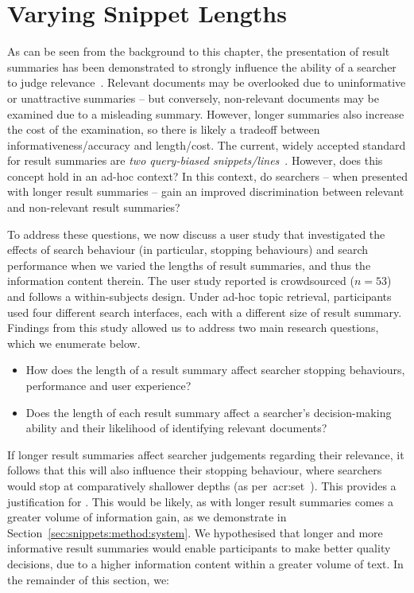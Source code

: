 \section{Varying Snippet Lengths}\label{chap:snippets:user}
As can be seen from the background to this chapter, the presentation of result summaries has been demonstrated to strongly influence the ability of a searcher to judge relevance~\citep{he2012bridging}. Relevant documents may be overlooked due to uninformative or unattractive summaries -- but conversely, non-relevant documents may be examined due to a misleading summary. However, longer summaries also increase the cost of the examination, so there is likely a tradeoff between informativeness/accuracy and length/cost. The current, widely accepted standard for result summaries are \emph{two query-biased snippets/lines}~\citep{hearst2009_search}. However, does this concept hold in an ad-hoc context? In this context, do searchers -- when presented with longer result summaries -- gain an improved discrimination between relevant and non-relevant result summaries?

To address these questions, we now discuss a user study that investigated the effects of search behaviour (in particular, stopping behaviours) and search performance when we varied the lengths of result summaries, and thus the information content therein. The user study reported is crowdsourced ($n=53$) and follows a within-subjects design. Under ad-hoc topic retrieval, participants used four different search interfaces, each with a different size of result summary. Findings from this study allowed us to address two main research questions, which we enumerate below.

\begin{itemize}
    \item{ How does the length of a result summary affect searcher stopping behaviours, performance and user experience?}
    \item{ Does the length of each result summary affect a searcher's decision-making ability and their likelihood of identifying relevant documents?}
\end{itemize}

If longer result summaries affect searcher judgements regarding their relevance, it follows that this will also influence their stopping behaviour, where searchers would stop at comparatively shallower depths (as per~\gls{acr:set}~\citep{azzopardi2011economics}). This provides a justification for . This would be likely, as with longer result summaries comes a greater volume of information gain, as we demonstrate in Section~\ref{sec:snippets:method:system}. We hypothesised that longer and more informative result summaries would enable participants to make better quality decisions, due to a higher information content within a greater volume of text. In the remainder of this section, we:

